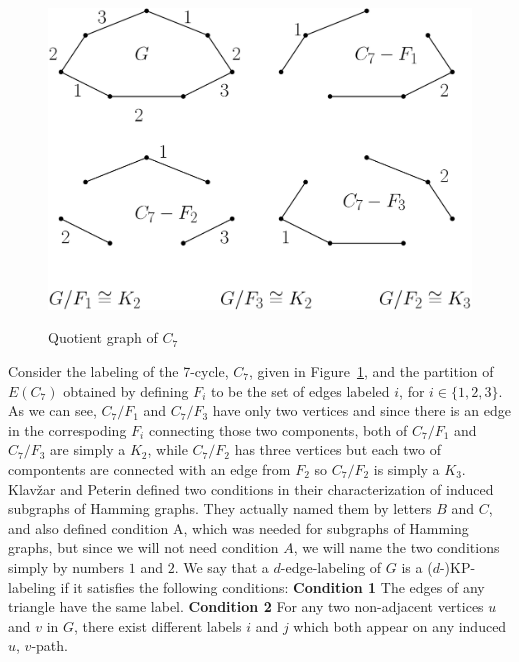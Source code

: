 \documentclass[12pt,a4paper,titlepage,openany]{report}
\begin{document}
\begin{figure}[h!]
\begin{center}
\includegraphics[width=0.8\linewidth]{figures/quotientgraph.png}\label{quotientgraphc7}
\end{center}
\caption{Quotient graph of $C_7$}
\end{figure}
Consider the labeling of the 7-cycle, $C_7$, given in Figure~\ref{quotientgraphc7}, and the partition of $E(C_7)$ obtained by defining $F_i$ to be the set of edges labeled $i$, for $i\in \{1,2,3\}$. As we can see, $C_7/ F_1$ and $C_7/F_3$ have only two vertices and since there is an edge in the correspoding $F_i$ connecting those two components, both of  $C_7/ F_1$ and $C_7/F_3$ are simply a $K_2$, while $C_7/ F_2$ has three vertices but each two of compontents are connected with an edge from $F_2$ so $C_7/ F_2$ is simply a $K_3$.   
\newline
Klav\v zar and Peterin defined two conditions in their characterization of induced subgraphs of Hamming graphs. They actually named them by letters $B$ and $C$, and also defined condition A, which was needed for subgraphs of Hamming graphs, but since we will not need condition $A$, we will name the two conditions simply by numbers $1$ and $2$.\newline
We say that a $d$-edge-labeling of $G$ is a ($d$-)KP-labeling if it satisfies the following conditions:
\newline
\textbf{Condition 1} The edges of any triangle have the same label.\newline
\textbf{Condition 2} For any two non-adjacent vertices $u$ and $v$ in $G$, there exist different labels $i$ and $j$ which both appear on any induced $u$, $v$-path.\newline
\end{document}
